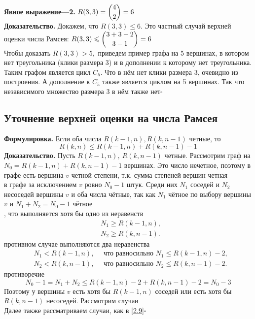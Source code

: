 \documentclass[a4paper]{article}
\begin{document}
\indent\textbf{Явное выражение—2.} $R(3,3)=\dbinom{4}{2}=6$\\[2mm]
\indent\textbf{Доказательство.} Докажем, что $R(3,3)\leqslant
6$. Это частный случай верхней оценки числа Рамсея: $R(3,3)\leqslant\dbinom{3+3-2}{3-1}=6$\\[2mm]
\indent Чтобы доказать $R(3, 3) > 5,$ приведем пример графа на 5 вершинах, в котором нет треугольника (клики размера 3) и в дополнении к которому нет треугольника. Таким графом является цикл $C_5$. Что в нём нет клики размера 3, очевидно из построения. А дополнение к $C_5$ также является циклом на 5 вершинах. Так что независимого множество размера 3 в нём также нет\hfill$\square$

\subsection{Уточнение верхней оценки на числа Рамсея}
\textbf{Формулировка.} Если оба числа $R(k-1,n),R(k,n-1)$ четные, то $$R(k,n)\leqslant R(k-1,n)+R(k,n-1)-1$$
\indent\textbf{Доказательство.} Пусть $R(k-1,n),\ R(k,n-1)$ четные. Рассмотрим граф на $N_0=R(k-1,n)+R(k,n-1)-1$ вершинах. Это число нечетное, поэтому в графе есть вершина $v$ четной степени, т.к. сумма степеней вершин четная\\[2mm]
 в графе за исключением $v$ ровно $N_0-1$ штук. Среди них $N_1$ соседей и $N_2$ несоседей вершины $v$ и оба числа чётные, так как $N_1$ чётное по выбору вершины $v$ и $N_1+N_2=N_0-1$ чётное\\[2mm]
, что выполняется хотя бы одно из неравенств
$$\begin{aligned}
& N_1 \geqslant R(k-1, n), \\
& N_2 \geqslant R(k, n-1) .
\end{aligned}$$
 противном случае выполняются два неравенства
$$\begin{aligned}
& N_1<R(k-1, n), \quad \text { что равносильно } N_1 \leqslant R(k-1, n)-2, \\
& N_2<R(k, n-1), \quad \text { что равносильно } N_2 \leqslant R(k, n-1)-2 .
\end{aligned}$$
 противоречие
$$N_0-1=N_1+N_2 \leqslant R(k-1, n)-2+R(k, n-1)-2=N_0-3$$
\indent Поэтому у вершины $v$ есть хотя бы $R(k-1, n)$ соседей или есть хотя бы $R(k, n-1)$ несоседей. Рассмотрим случаи\\[2mm]
\indent Далее также рассматриваем случаи, как в \ref{2.9}\hfill$\square$
\end{document}
